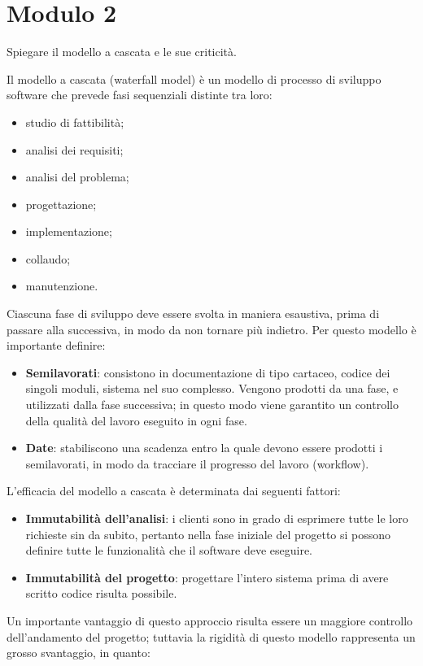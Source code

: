 \newpage
\section{Modulo 2}
\begin{problem}{2.1}
Spiegare il modello a cascata e le sue criticità.
\end{problem}
\begin{solution}
Il modello a cascata (waterfall model) è un modello di processo di sviluppo software che prevede fasi sequenziali distinte tra loro:
\begin{itemize}
	\item studio di fattibilità;
	\item analisi dei requisiti;
	\item analisi del problema;
	\item progettazione;
	\item implementazione;
	\item collaudo;
	\item manutenzione.
\end{itemize}
Ciascuna fase di sviluppo deve essere svolta in maniera esaustiva, prima di passare alla successiva, in modo da non tornare più indietro.
Per questo modello è importante definire:
\begin{itemize}
	\item \textbf{Semilavorati}: consistono in documentazione di tipo cartaceo, codice dei singoli moduli, sistema nel suo complesso.\newline
	Vengono prodotti da una fase, e utilizzati dalla fase successiva; in questo modo viene garantito un controllo della qualità del lavoro eseguito in ogni fase.
	\item \textbf{Date}: stabiliscono una scadenza entro la quale devono essere prodotti i semilavorati, in modo da tracciare il progresso del lavoro (workflow).
\end{itemize}
L'efficacia del modello a cascata è determinata dai seguenti fattori:
\begin{itemize}
	\item \textbf{Immutabilità dell'analisi}: i clienti sono in grado di esprimere tutte le loro richieste sin da subito, pertanto nella fase iniziale del progetto si possono definire tutte le funzionalità che il software deve eseguire.
	\item \textbf{Immutabilità del progetto}: progettare l'intero sistema prima di avere scritto codice risulta possibile.
\end{itemize}
Un importante vantaggio di questo approccio risulta essere un maggiore controllo dell'andamento del progetto; tuttavia la rigidità di questo modello rappresenta un grosso svantaggio, in quanto:

\end{solution}
